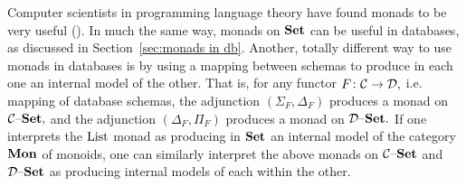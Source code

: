 \documentclass[CT4S-EN-RU]{subfiles}
\begin{document}
\begin{blockENG}
Computer scientists in programming language theory have found monads to be very useful (\cite{Mog}). In much the same way, monads on ${\mathbf{Set}}$ can be useful in databases, as discussed in Section~\ref{sec:monads in db}. Another, totally different way to use monads in databases is by using a mapping between schemas to produce in each one an internal model of the other. That is, for any functor $F\colon\mathcal{C}\rightarrow\mathcal{D},$ i.e. mapping of database schemas, the adjunction $(\Sigma_F,\Delta_F)$ produces a monad on $\mathcal{C}{\text \textendash}{\mathbf{Set}},$ and the adjunction $(\Delta_F,\Pi_F)$ produces a monad on $\mathcal{D}{\text \textendash}{\mathbf{Set}}.$ If one interprets the $\textnormal{List}$ monad as producing in ${\mathbf{Set}}$ an internal model of the category ${\mathbf{Mon}}$ of monoids, one can similarly interpret the above monads on $\mathcal{C}{\text \textendash}{\mathbf{Set}}$ and $\mathcal{D}{\text \textendash}{\mathbf{Set}}$ as producing internal models of each within the other.
\end{blockENG}

\begin{blockRUS}
\end{blockRUS}
\end{document}
